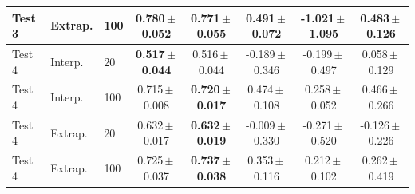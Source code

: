 \begin{table}
\begin{tabular}{lllccccc}
Test 3 & Extrap. & 100 & \textbf{0.780\,$\pm$\,0.052} & 0.771\,$\pm$\,0.055 & 0.491\,$\pm$\,0.072 & -1.021\,$\pm$\,1.095 & 0.483\,$\pm$\,0.126 \\
\midrule
Test 4 & Interp. & 20 & \textbf{0.517\,$\pm$\,0.044} & 0.516\,$\pm$\,0.044 & -0.189\,$\pm$\,0.346 & -0.199\,$\pm$\,0.497 & 0.058\,$\pm$\,0.129 \\
Test 4 & Interp. & 100 & 0.715\,$\pm$\,0.008 & \textbf{0.720\,$\pm$\,0.017} & 0.474\,$\pm$\,0.108 & 0.258\,$\pm$\,0.052 & 0.466\,$\pm$\,0.266 \\
Test 4 & Extrap. & 20 & 0.632\,$\pm$\,0.017 & \textbf{0.632\,$\pm$\,0.019} & -0.009\,$\pm$\,0.330 & -0.271\,$\pm$\,0.520 & -0.126\,$\pm$\,0.226 \\
Test 4 & Extrap. & 100 & 0.725\,$\pm$\,0.037 & \textbf{0.737\,$\pm$\,0.038} & 0.353\,$\pm$\,0.116 & 0.212\,$\pm$\,0.102 & 0.262\,$\pm$\,0.419 \\
\bottomrule
\end{tabular}
\end{table}
